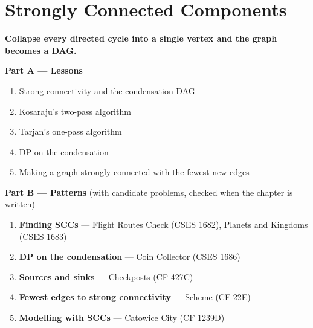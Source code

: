 \chapter{Strongly Connected Components}
\label{ch:scc}

\begin{tcolorbox}[enhanced, colback=white, colframe=secondaryblue, boxrule=1pt, arc=2mm]
\textbf{\large\textcolor{primaryblue}{Collapse every directed cycle into a single vertex and the graph becomes a DAG.}}
\end{tcolorbox}


\begin{plannedbox}
\textbf{Part A --- Lessons}
\begin{enumerate}[leftmargin=*, label=\textbf{A\arabic*.}, itemsep=1pt]
    \item Strong connectivity and the condensation DAG
    \item Kosaraju's two-pass algorithm
    \item Tarjan's one-pass algorithm
    \item DP on the condensation
    \item Making a graph strongly connected with the fewest new edges
\end{enumerate}
\textbf{Part B --- Patterns} (with candidate problems, checked when the chapter is written)
\begin{enumerate}[leftmargin=*, label=\textbf{P\arabic*.}, itemsep=1pt]
    \item \textbf{Finding SCCs} --- Flight Routes Check {\small\color{darkgray}(CSES 1682)}, Planets and Kingdoms {\small\color{darkgray}(CSES 1683)}
    \item \textbf{DP on the condensation} --- Coin Collector {\small\color{darkgray}(CSES 1686)}
    \item \textbf{Sources and sinks} --- Checkposts {\small\color{darkgray}(CF 427C)}
    \item \textbf{Fewest edges to strong connectivity} --- Scheme {\small\color{darkgray}(CF 22E)}
    \item \textbf{Modelling with SCCs} --- Catowice City {\small\color{darkgray}(CF 1239D)}
\end{enumerate}
\end{plannedbox}
